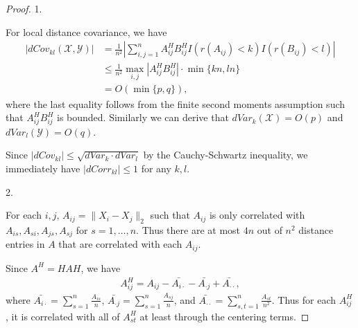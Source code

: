 \documentclass[12pt]{article}
\begin{document}
\begin{proof}
1.

For local distance covariance, we have
\begin{align*}
|dCov_{kl}(\mathcal{X},\mathcal{Y})| &= \frac{1}{n^2} |\sum_{i,j=1}^{n}A^{H}_{ij}B^{H}_{ij}I(r(A_{ij})<k)I(r(B_{ij})<l) | \\
                                   & \leq \frac{1}{n^2} \max_{i,j}|A^{H}_{ij}B^{H}_{ij}| \cdot \min\{kn,ln\} \\
																	 & = O(\min\{p,q\}),
\end{align*}
where the last equality follows from the finite second moments assumption such that $A^{H}_{ij}B^{H}_{ij}$ is bounded. Similarly we can derive that $dVar_{k}(\mathcal{X}) = O(p)$ and $dVar_{l}(\mathcal{Y}) = O(q)$. 

Since $|dCov_{kl}| \leq \sqrt{dVar_{k} \cdot dVar_{l}}$ by the Cauchy-Schwartz inequality, we immediately have $|dCorr_{kl}| \leq 1$ for any $k,l$.

2.

For each $i,j$, $A_{ij}=\|X_{i}-X_{j}\|_{2}$ such that $A_{ij}$ is only correlated with $A_{is}, A_{si},A_{js}, A_{sj}$ for $s=1,\ldots,n$. Thus there are at most $4n$ out of $n^2$ distance entries in $A$ that are correlated with each $A_{ij}$.

Since $A^{H}=HAH$, we have 
\begin{align*}
A^{H}_{ij}=A_{ij}-\bar{A_{i\cdot}}-\bar{A_{\cdot j}}+\bar{A_{\cdot \cdot}},
\end{align*}
where $\bar{A_{i\cdot}}=\sum_{s=1}^{n}\frac{A_{is}}{n}$, $\bar{A_{\cdot j}}=\sum_{s=1}^{n}\frac{A_{sj}}{n}$, and $\bar{A_{\cdot \cdot}}=\sum_{s,t=1}^{n}\frac{A_{st}}{n^2}$. Thus for each $A^{H}_{ij}$, it is correlated with all of $A^{H}_{st}$ at least through the centering terms.


\end{proof}
\end{document}
